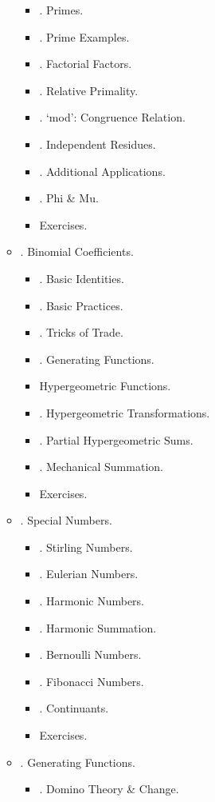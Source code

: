 \documentclass{article}
\begin{document}
\begin{enumerate}
\begin{itemize}
\begin{itemize}
			\item {. Primes.}
			\item {. Prime Examples.}
			\item {. Factorial Factors.}
			\item {. Relative Primality.}
			\item {. `mod': Congruence Relation.}
			\item {. Independent Residues.}
			\item {. Additional Applications.}
			\item {. Phi \& Mu.}
			\item {\sf Exercises.}
		\end{itemize}
		\item {. Binomial Coefficients.}
		\begin{itemize}
			\item {. Basic Identities.}
			\item {. Basic Practices.}
			\item {. Tricks of Trade.}
			\item {. Generating Functions.}
			\item { Hypergeometric Functions.}
			\item {. Hypergeometric Transformations.}
			\item {. Partial Hypergeometric Sums.}
			\item {. Mechanical Summation.}
			\item {\sf Exercises.}
		\end{itemize}
		\item {. Special Numbers.}
		\begin{itemize}
			\item {. Stirling Numbers.}
			\item {. Eulerian Numbers.}
			\item {. Harmonic Numbers.}
			\item {. Harmonic Summation.}
			\item {. Bernoulli Numbers.}
			\item {. Fibonacci Numbers.}
			\item {. Continuants.}
			\item {\sf Exercises.}
		\end{itemize}
		\item {. Generating Functions.}
		\begin{itemize}
			\item {. Domino Theory \& Change.}

\end{itemize}
\end{itemize}
\end{enumerate}
\end{document}
